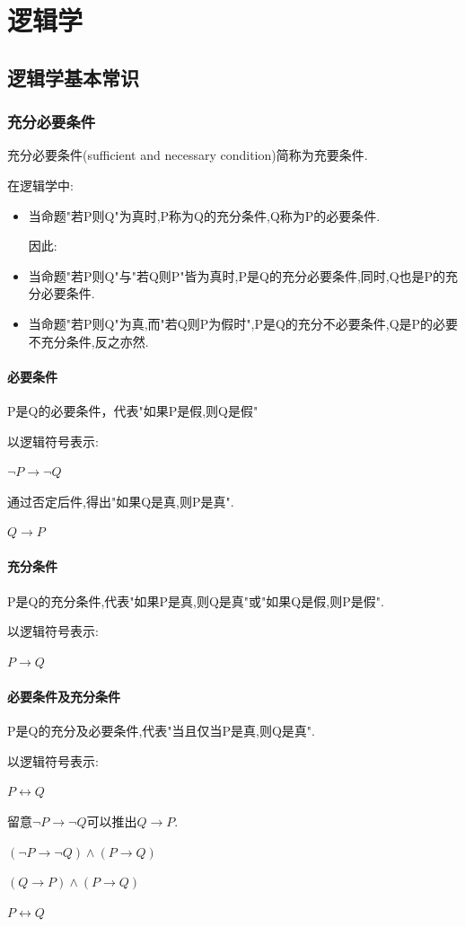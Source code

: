 \documentclass[UTF8,12pt]{ctexbook}
\begin{document}
\chapter{逻辑学}{

  \section{逻辑学基本常识}{

    \subsection{充分必要条件}{

      充分必要条件(sufficient and necessary condition)简称为充要条件.

      在逻辑学中:
      \begin{itemize}
        \item 当命题"若P则Q"为真时,P称为Q的充分条件,Q称为P的必要条件.

              因此:

        \item 当命题"若P则Q"与"若Q则P"皆为真时,P是Q的充分必要条件,同时,Q也是P的充分必要条件.
        \item 当命题"若P则Q"为真,而"若Q则P为假时",P是Q的充分不必要条件,Q是P的必要不充分条件,反之亦然.
      \end{itemize}

      \subsubsection{必要条件}{
        P是Q的必要条件，代表"如果P是假,则Q是假"

        以逻辑符号表示:

        $\lnot P \to \lnot Q$

        通过否定后件,得出"如果Q是真,则P是真".

        $Q \to P$
      }%

      \subsubsection{充分条件}{
        P是Q的充分条件,代表"如果P是真,则Q是真"或"如果Q是假,则P是假".

        以逻辑符号表示:

        $P \to Q$
      }%

      \subsubsection{必要条件及充分条件}{
        P是Q的充分及必要条件,代表"当且仅当P是真,则Q是真".

        以逻辑符号表示:

        $P \longleftrightarrow Q$

        留意$\lnot P \to \lnot Q$可以推出$Q \to P$.

        $(\lnot P \to \lnot Q) \land (P \to Q)$

        $(Q \to P) \land (P \to Q)$

        $P \longleftrightarrow Q$
      }%

    }%

   }%

 }%
\end{document}
